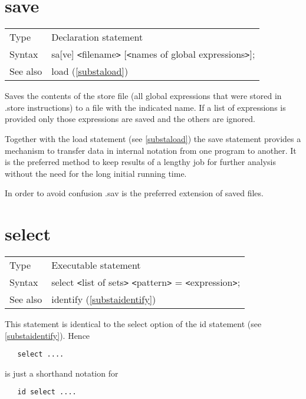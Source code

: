 \section{save}
\label{substasave}

\noindent \begin{tabular}{ll}
Type & Declaration statement\\
Syntax & sa[ve] {\tt<}filename{\tt>} [{\tt<}names of global expressions{\tt>}];
\\ See also & load (\ref{substaload})
\end{tabular}\vspace{4mm}

\noindent Saves the contents of the store 
file (all global expressions that were stored in 
.store 
instructions) to a file with the indicated name. If a list of expressions 
is provided only those expressions are saved and the others are ignored. 

\noindent Together with the load statement (see 
\ref{substaload}) the save statement provides a mechanism to transfer data 
in internal notation from one program to another. It is the preferred method 
to keep results of a lengthy job for further analysis without the need for 
the long initial running time.

\noindent In order to avoid confusion .sav\label{ex:sav} is the 
preferred extension of saved files.\vspace{10mm}


\section{select}
\label{substaselect}

\noindent \begin{tabular}{ll}
Type & Executable statement\\
Syntax & select {\tt<}list of sets{\tt>} {\tt<}pattern{\tt>} = {\tt<}expression{\tt>};
\\ See also & identify (\ref{substaidentify})
\end{tabular} \vspace{4mm}

\noindent This statement is identical to the select option of 
the id statement (see \ref{substaidentify}). Hence
\begin{verbatim}
   select ....
\end{verbatim}
is just a shorthand notation for
\begin{verbatim}
   id select ....
\end{verbatim}
\vspace{10mm}

